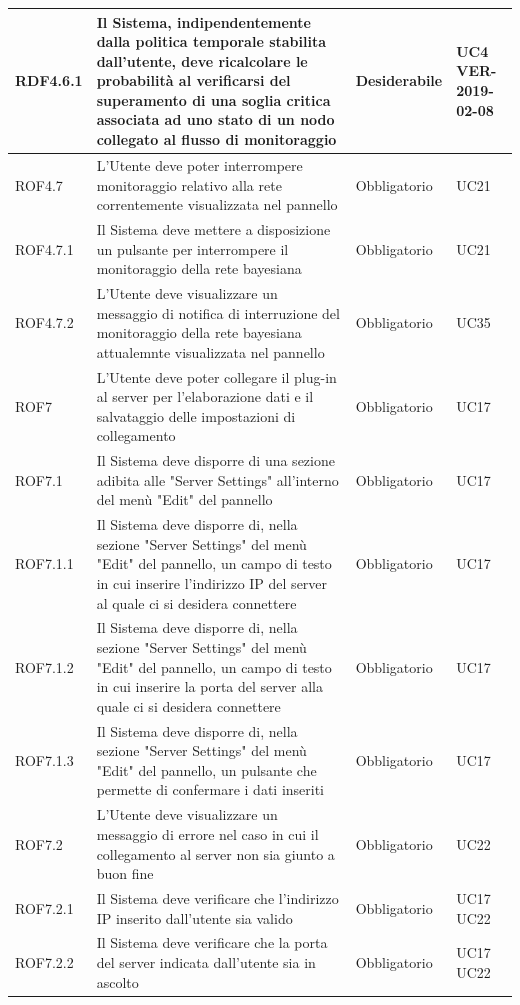 \begin{center}
\begin{longtable}[c]{|m{}|m{}|m{}|m{}|}
\hline
RDF4.6.1 & Il Sistema, indipendentemente dalla politica temporale stabilita dall'utente, deve ricalcolare le probabilità al verificarsi del superamento di una soglia critica associata ad uno stato di un nodo collegato al flusso di monitoraggio & Desiderabile & UC4 VER-2019-02-08\\
\hline
\rowcolor{grigio}ROF4.7 & L'Utente deve poter interrompere monitoraggio relativo alla rete correntemente visualizzata nel pannello & Obbligatorio & UC21\\
\hline
ROF4.7.1 & Il Sistema deve mettere a disposizione un pulsante per interrompere il monitoraggio della rete bayesiana & Obbligatorio & UC21\\
\hline
\rowcolor{grigio}ROF4.7.2 & L'Utente deve visualizzare un messaggio di notifica di interruzione del monitoraggio della rete bayesiana attualemnte visualizzata nel pannello & Obbligatorio & UC35\\
\hline
ROF7 & L'Utente deve poter collegare il plug-in al server per l'elaborazione dati e il salvataggio delle impostazioni di collegamento & Obbligatorio & UC17\\
\hline
\rowcolor{grigio}ROF7.1 & Il Sistema deve disporre di una sezione adibita alle "Server Settings" all'interno del menù "Edit" del pannello & Obbligatorio & UC17\\
\hline
ROF7.1.1 & Il Sistema deve disporre di, nella sezione "Server Settings" del menù "Edit" del pannello, un campo di testo in cui inserire l'indirizzo IP del server al quale ci si desidera connettere & Obbligatorio & UC17\\
\hline
\rowcolor{grigio}ROF7.1.2 & Il Sistema deve disporre di, nella sezione "Server Settings" del menù "Edit" del pannello, un campo di testo in cui inserire la porta del server alla quale ci si desidera connettere & Obbligatorio & UC17\\
\hline
ROF7.1.3 & Il Sistema deve disporre di, nella sezione "Server Settings" del menù "Edit" del pannello, un pulsante che permette di confermare i dati inseriti & Obbligatorio & UC17\\
\hline
\rowcolor{grigio}ROF7.2 & L'Utente deve visualizzare un messaggio di errore nel caso in cui il collegamento al server non sia giunto a buon fine& Obbligatorio & UC22\\
\hline
ROF7.2.1 & Il Sistema deve verificare che l'indirizzo IP inserito dall'utente sia valido & Obbligatorio & UC17 UC22\\
\hline
\rowcolor{grigio}ROF7.2.2 & Il Sistema deve verificare che la porta del server indicata dall'utente sia in ascolto & Obbligatorio & UC17 UC22\\

\end{longtable}
\end{center}
